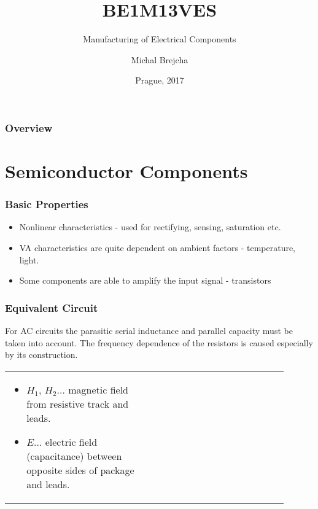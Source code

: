 \documentclass{beamer}
\title[BE1M13VES]{BE1M13VES}
\subtitle[Manufacturing of Electrical Components] {Manufacturing of Electrical Components}
\author[Brejcha]{Michal Brejcha}
\institute[CTU]{CTU in Prague}
\date[Prague, 2017]{Prague, 2017}
\begin{document}
\frame{\titlepage}

\begin{frame}
\frametitle{Overview} 
\tableofcontents
\end{frame}


\section{\texorpdfstring{Semiconductor Components}{Semiconductor Components}}
	\begin{frame}
    \frametitle{Basic Properties}
		\begin{itemize}
		\item Nonlinear characteristics - used for rectifying, sensing, saturation etc.
		\item VA characteristics are quite dependent on ambient factors - temperature, light.
		\item Some components are able to amplify the input signal - transistors
		\end{itemize}
		
	\end{frame}
	\begin{frame}
    \frametitle{Equivalent Circuit}
		
		For AC circuits the parasitic serial inductance and parallel capacity must be taken into account. The frequency dependence of the resistors is caused especially by its construction.
		\begin{center}
			\begin{tabular}{m{0.45\linewidth} m{0.45\linewidth}}
			
			\begin{itemize}
				\item $H_1$, $H_2$... magnetic field from resistive track and leads.
				\item $E$... electric field (capacitance) between opposite sides of package and leads.
			\end{itemize}
			\end{tabular}
		\end{center}
	\end{frame}
\end{document}

